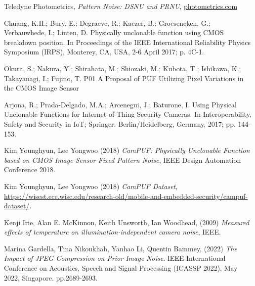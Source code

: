 \begin{thebibliography}{9}

Teledyne Photometrics, \emph{Pattern Noise: DSNU and PRNU}, \url{photometrics.com}

Chuang, K.H.; Bury, E.; Degraeve, R.; Kaczer, B.; Groeseneken, G.; Verbauwhede, I.; Linten, D. Physically unclonable function
using CMOS breakdown position. In Proceedings of the IEEE International Reliability Physics Symposium (IRPS), Monterey, CA,
USA, 2-6 April 2017; p. 4C-1.

Okura, S.; Nakura, Y.; Shirahata, M.; Shiozaki, M.; Kubota, T.; Ishikawa, K.; Takayanagi, I.; Fujino, T. P01 A Proposal of PUF
Utilizing Pixel Variations in the CMOS Image Sensor

Arjona, R.; Prada-Delgado, M.A.; Arcenegui, J.; Baturone, I. Using Physical Unclonable Functions for Internet-of-Thing Security
Cameras. In Interoperability, Safety and Security in IoT; Springer: Berlin/Heidelberg, Germany, 2017; pp. 144-153.

Kim Younghyun, Lee Yongwoo (2018) \emph{CamPUF: Physically Unclonable Function based on CMOS Image Sensor Fixed Pattern Noise}, IEEE Design Automation Conference 2018.

Kim Younghyun, Lee Yongwoo (2018) \emph{CamPUF Dataset}, \url{https://wisest.ece.wisc.edu/research-old/mobile-and-embedded-security/campuf-dataset/}.

Kenji Irie, Alan E. McKinnon, Keith Unsworth, Ian Woodhead, (2009) \emph{Measured effects of temperature on illumination-independent camera noise}, IEEE.

Marina Gardella, Tina Nikoukhah, Yanhao Li, Quentin Bammey, (2022) \emph{The Impact of JPEG Compression on Prior Image Noise}.  IEEE International Conference on Acoustics, Speech and Signal Processing (ICASSP 2022), May 2022, Singapore. pp.2689-2693.

\end{thebibliography}